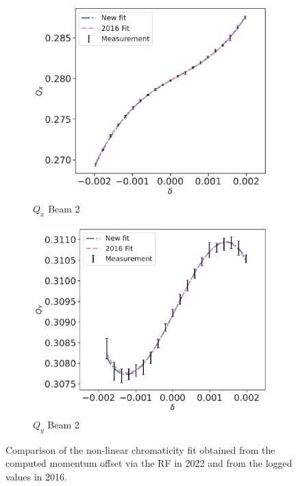 \begin{figure}[!htb]
\begin{subfigure}{0.49\textwidth}
    \end{subfigure}
    \\
    \begin{subfigure}{0.49\textwidth}
        \centering
        \includegraphics[width=\textwidth]{./images/chromaticity_2016/B1_qx.pdf}
        \caption{$Q_x$ Beam 2}
        \label{}
    \end{subfigure}
    \hfill
    \begin{subfigure}{0.49\textwidth}
        \centering
        \includegraphics[width=\textwidth]{./images/chromaticity_2016/B2_qy.pdf}
        \caption{$Q_y$ Beam 2}
        \label{}
    \end{subfigure}
    \caption{Comparison of the non-linear chromaticity fit obtained from the computed momentum
    offset via the RF in 2022 and from the logged values in 2016.}
    \label{fig:very_high_orders:bare_chroma_2016}
\end{figure}

